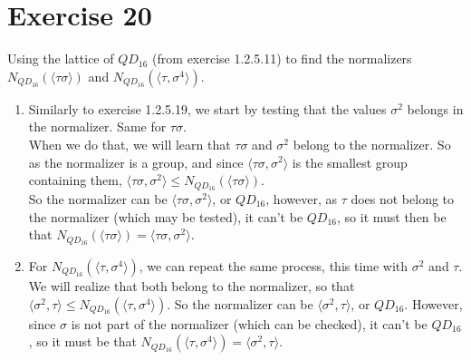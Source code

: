 \documentclass[12pt]{article}
\begin{document}
    \section*{Exercise 20}    
    Using the lattice of $QD_{16}$ (from exercise 1.2.5.11)
    to find the normalizers
    $N_{QD_{16}}(\langle \tau\sigma \rangle)$
    and $N_{QD_{16}}(\langle \tau, \sigma^4 \rangle)$. \\
    \begin{enumerate}[label=\textbf{\alph*.}]
        \item
            Similarly to exercise 1.2.5.19,
            we start by testing that the values $\sigma^2$ belongs in the
            normalizer. Same for $\tau\sigma$. \\
            When we do that, we will learn that
            $\tau\sigma$ and $\sigma^2$ belong to the normalizer.
            So as the normalizer is a group,
            and since $\langle \tau\sigma, \sigma^2 \rangle$ is the
            smallest group containing them,
            $\langle \tau\sigma, \sigma^2 \rangle \leqslant 
            N_{QD_{16}}(\langle \tau\sigma \rangle)$. \\
            So the normalizer can be $\langle \tau\sigma, \sigma^2 \rangle$,
            or $QD_{16}$,
            however, as $\tau$ does not belong to the normalizer
            (which may be tested),
            it can't be $QD_{16}$,
            so it must then be that 
            $ N_{QD_{16}}(\langle \tau\sigma \rangle)
            = \langle \tau\sigma, \sigma^2 \rangle$.
        \item
            For $N_{QD_{16}}(\langle \tau, \sigma^4 \rangle)$,
            we can repeat the same process,
            this time with $\sigma^2$ and $\tau$.
            We will realize that both belong to the normalizer,
            so that
            $\langle \sigma^2, \tau \rangle
            \leqslant N_{QD_{16}}(\langle \tau, \sigma^4 \rangle)$.
            So the normalizer can be $\langle \sigma^2, \tau \rangle$,
            or $QD_{16}$.
            However, since $\sigma$ is not part of the normalizer
            (which can be checked),
            it can't be $QD_{16}$,
            so it must be that 
            $ N_{QD_{16}}(\langle \tau, \sigma^4 \rangle)
            = \langle \sigma^2, \tau \rangle$.
    \end{enumerate}
\end{document}
